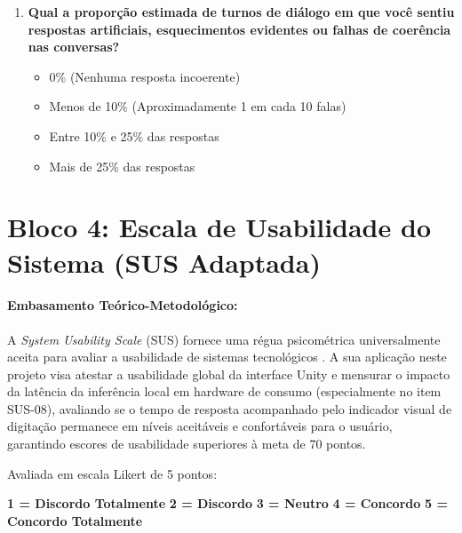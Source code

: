 \begin{enumerate}[label=\textbf{C\arabic*.}, noitemsep, topsep=1pt, parsep=0pt]
    \item \textbf{Qual a proporção estimada de turnos de diálogo em que você sentiu respostas artificiais, esquecimentos evidentes ou falhas de coerência nas conversas?}
    \begin{itemize}[label={$\square$}, noitemsep, topsep=1pt, parsep=0pt]
        \item 0\% (Nenhuma resposta incoerente)
        \item Menos de 10\% (Aproximadamente 1 em cada 10 falas)
        \item Entre 10\% e 25\% das respostas
        \item Mais de 25\% das respostas
    \end{itemize}
\end{enumerate}

\vspace{0.05cm}

\section{Bloco 4: Escala de Usabilidade do Sistema (SUS Adaptada)}
\label{sec:apendice_d_bloco4}

\paragraph*{Embasamento Teórico-Metodológico:} A \textit{System Usability Scale} (SUS) \cite{brooke1996sus} fornece uma régua psicométrica universalmente aceita para avaliar a usabilidade de sistemas tecnológicos \cite{bangor2008empirical}. A sua aplicação neste projeto visa atestar a usabilidade global da interface Unity e mensurar o impacto da latência da inferência local em hardware de consumo (especialmente no item SUS-08), avaliando se o tempo de resposta acompanhado pelo indicador visual de digitação permanece em níveis aceitáveis e confortáveis para o usuário, garantindo escores de usabilidade superiores à meta de 70 pontos.

\noindent Avaliada em escala Likert de 5 pontos:
\begin{center}
\textbf{1 = Discordo Totalmente} \quad \textbf{2 = Discordo} \quad \textbf{3 = Neutro} \quad \textbf{4 = Concordo} \quad \textbf{5 = Concordo Totalmente}
\end{center}

